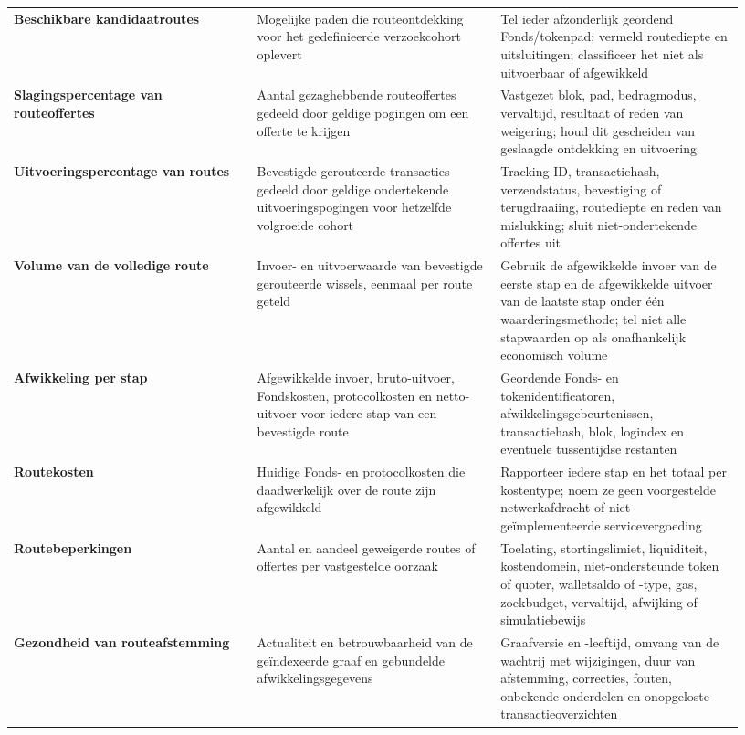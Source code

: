 \documentclass[11pt]{article}
\begin{document}
\begin{longtable}{P{0.31\linewidth} P{0.31\linewidth} P{0.31\linewidth}}
\textbf{Beschikbare kandidaatroutes} & Mogelijke paden die routeontdekking voor het gedefinieerde verzoekcohort oplevert & Tel ieder afzonderlijk geordend Fonds/tokenpad; vermeld routediepte en uitsluitingen; classificeer het niet als uitvoerbaar of afgewikkeld \\
\textbf{Slagingspercentage van routeoffertes} & Aantal gezaghebbende routeoffertes gedeeld door geldige pogingen om een offerte te krijgen & Vastgezet blok, pad, bedragmodus, vervaltijd, resultaat of reden van weigering; houd dit gescheiden van geslaagde ontdekking en uitvoering \\
\textbf{Uitvoeringspercentage van routes} & Bevestigde gerouteerde transacties gedeeld door geldige ondertekende uitvoeringspogingen voor hetzelfde volgroeide cohort & Tracking-ID, transactiehash, verzendstatus, bevestiging of terugdraaiing, routediepte en reden van mislukking; sluit niet-ondertekende offertes uit \\
\textbf{Volume van de volledige route} & Invoer- en uitvoerwaarde van bevestigde gerouteerde wissels, eenmaal per route geteld & Gebruik de afgewikkelde invoer van de eerste stap en de afgewikkelde uitvoer van de laatste stap onder één waarderingsmethode; tel niet alle stapwaarden op als onafhankelijk economisch volume \\
\textbf{Afwikkeling per stap} & Afgewikkelde invoer, bruto-uitvoer, Fondskosten, protocolkosten en netto-uitvoer voor iedere stap van een bevestigde route & Geordende Fonds- en tokenidentificatoren, afwikkelingsgebeurtenissen, transactiehash, blok, logindex en eventuele tussentijdse restanten \\
\textbf{Routekosten} & Huidige Fonds- en protocolkosten die daadwerkelijk over de route zijn afgewikkeld & Rapporteer iedere stap en het totaal per kostentype; noem ze geen voorgestelde netwerkafdracht of niet-geïmplementeerde servicevergoeding \\
\textbf{Routebeperkingen} & Aantal en aandeel geweigerde routes of offertes per vastgestelde oorzaak & Toelating, stortingslimiet, liquiditeit, kostendomein, niet-ondersteunde token of quoter, walletsaldo of -type, gas, zoekbudget, vervaltijd, afwijking of simulatiebewijs \\
\textbf{Gezondheid van routeafstemming} & Actualiteit en betrouwbaarheid van de geïndexeerde graaf en gebundelde afwikkelingsgegevens & Graafversie en -leeftijd, omvang van de wachtrij met wijzigingen, duur van afstemming, correcties, fouten, onbekende onderdelen en onopgeloste transactieoverzichten \\

\end{longtable}
\end{document}
